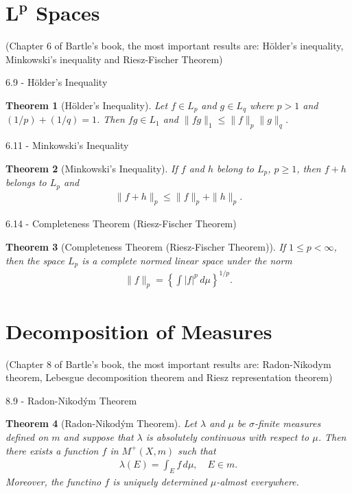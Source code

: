 \documentclass{article}
\newtheorem{theorem}{Theorem}[section]
\numberwithin{equation}{section}
\begin{document}
\newpage

\section{$\mathbf{L^p}$ Spaces}
(Chapter 6 of Bartle's book, the most important results are: Hölder's inequality, Minkowski's inequality and Riesz-Fischer Theorem)

6.9 - Hölder's Inequality

\begin{theorem}[Hölder's Inequality]
    Let $f\in L_p$ and $g \in L_q$ where $p>1$ and $(1/p) + (1/q) = 1$.
    Then $fg\in L_1$ and  $\| fg \|_1 \leq \|f\|_p \|g\|_q$.
\end{theorem}

6.11 - Minkowski's Inequality

\begin{theorem}[Minkowski's Inequality]
    If $f$ and $h$ belong to $L_p$, $p \geq 1$, then $f + h$ belongs to $L_p$ and
    \begin{align}\label{eq:b6.6}
        \| f + h \|_p \leq \| f \|_p + \| h \|_p.
    \end{align}
\end{theorem}

6.14 - Completeness Theorem (Riesz-Fischer Theorem)

\begin{theorem}[Completeness Theorem (Riesz-Fischer Theorem)]
    If $1\leq p < \infty$, then the space $L_p$ is a complete normed linear space under the norm
    \begin{align}\label{eq:b-under_th6.14}
        \| f \|_p = \left\{ \int |f|^p \, d\mu \right\}^{1/p}.
    \end{align}
\end{theorem}

\newpage

\section{Decomposition of Measures}
(Chapter 8 of Bartle's book, the most important results are: Radon-Nikodym theorem, Lebesgue decomposition theorem and Riesz representation theorem)

8.9 - Radon-Nikodým Theorem

\begin{theorem}[Radon-Nikodým Theorem]
    Let $\lambda$ and $\mu$ be $\sigma$-finite measures defined on $m$ and suppose that $\lambda$ is absolutely continuous with respect to $\mu$.
    Then there exists a function $f$ in $M^+(X,m)$ such that
    \begin{align}\label{eq:b8.6}
        \lambda(E) = \int_E f \, d\mu, \quad E \in m.
    \end{align}
    Moreover, the functino $f$ is uniquely determined $\mu$-almost everywhere.
\end{theorem}
\end{document}
